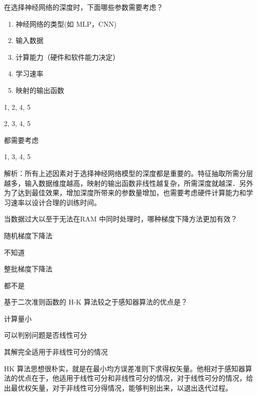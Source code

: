 \documentclass{exam-zh}
\begin{document}
\begin{question}
	在选择神经网络的深度时，下面哪些参数需要考虑？\begin{enumerate}
		\item 神经网络的类型(如 MLP，CNN)
		\item 输入数据
		\item 计算能力（硬件和软件能力决定）
		\item 学习速率
		\item 映射的输出函数
	\end{enumerate}\paren[C]
	\begin{choices}
		\item 1, 2, 4, 5
		\item 2, 3, 4, 5
		\item 都需要考虑
		\item 1, 3, 4, 5
	\end{choices}
	\begin{solution}
		解析：所有上述因素对于选择神经网络模型的深度都是重要的。特征抽取所需分层越多，输入数据维度越高，映射的输出函数非线性越复杂，所需深度就越深．另外为了达到最佳效果，增加深度所带来的参数量增加，也需要考虑硬件计算能力和学习速率以设计合理的训练时间。
	\end{solution}
\end{question}

\begin{question}
	当数据过大以至于无法在RAM 中同时处理时，哪种梯度下降方法更加有效？\paren[A]
	\begin{choices}
		\item 随机梯度下降法
		\item 不知道
		\item 整批梯度下降法
		\item 都不是
	\end{choices}
\end{question}

\begin{question}
	基于二次准则函数的 H-K 算法较之于感知器算法的优点是？\paren[B]
	\begin{choices}
		\item 计算量小
		\item 可以判别问题是否线性可分
		\item 其解完全适用于非线性可分的情况
	\end{choices}
	\begin{solution}
		HK 算法思想很朴实，就是在最小均方误差准则下求得权矢量。他相对于感知器算法的优点在于，他适用于线性可分和非线性可分的情况，对于线性可分的情况，给出最优权矢量，对于非线性可分得情况，能够判别出来，以退出迭代过程。
	\end{solution}
\end{question}
\end{document}
